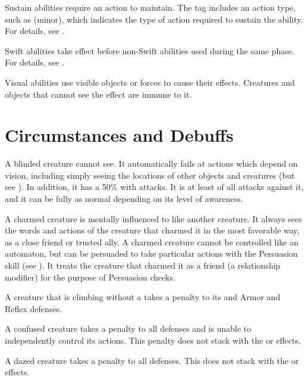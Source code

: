      Sustain abilities require an action to maintain.
    The tag includes an action type, such as (minor), which indicates the type of action required to sustain the ability.
    For details, see .

     Swift abilities take effect before non-Swift abilities used during the same phase.
    For details, see .

     Visual abilities use visible objects or forces to cause their effects.
    Creatures and objects that cannot see the effect are immune to it.

\newpage
\section{Circumstances and Debuffs}\label{Circumstances and Debuffs}

     A blinded creature cannot see.
    It automatically fails at actions which depend on vision, including simply seeing the locations of other objects and creatures (but see ).
    In addition, it has a 50\%  with  attacks.
    It is at least \partiallyunaware of all attacks against it, and it can be fully \unaware as normal depending on its level of awareness.

     A charmed creature is mentally influenced to like another creature.
    It always sees the words and actions of the creature that charmed it in the most favorable way, as a close friend or trusted ally.
    A charmed creature cannot be controlled like an automaton, but can be persuaded to take particular actions with the Persuasion skill (see ).
    It treats the creature that charmed it as a friend (a  relationship modifier) for the purpose of Persuasion checks.

     A creature that is climbing without a  takes a  penalty to its  and Armor and Reflex defenses.

     A confused creature takes a  penalty to all defenses and is unable to independently control its actions.
    This penalty does not stack with the \dazed or \stunned effects.
    \confusionexplanation

     A dazed creature takes a  penalty to all defenses.
    This does not stack with the \stunned or \confused effects.

